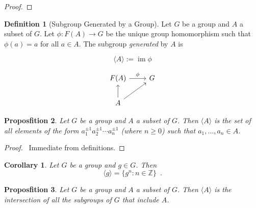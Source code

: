 \documentclass{book}
\let\qed\relax
\newtheorem{prop}{Proposfition}[chapter]
\newtheorem{cor}{Corollary}[prop]
\theoremstyle{definition}
\newtheorem{df}[prop]{Definition}
\newcommand{\im}{\ensuremath{\operatorname{im}}}
\begin{document}
\begin{proof}
    \pf
    \qed
\end{proof}

\begin{df}[Subgroup Generated by a Group]
Let $G$ be a group and $A$ a subset of $G$. Let $\phi : F(A) \rightarrow G$ be the unique group homomorphism such that $\phi(a) = a$ for all $a \in A$. The subgroup \emph{generated} by $A$ is

\[ \langle A \rangle := \im \phi \]

\[ \begin{tikzcd}
F(A) \arrow[r,"\phi"] & G \\
A \arrow[u] \arrow[ur]
\end{tikzcd} \]
\end{df}

\begin{prop}
Let $G$ be a group and $A$ a subset of $G$. Then $\langle A \rangle$ is the set of all elements of the form $a_1^{\pm 1} a_2^{\pm 1} \cdots a_n^{\pm 1}$ (where $n \geq 0$) such that $a_1, \ldots, a_n \in A$.
\end{prop}

\begin{proof}
\pf\ Immediate from definitions. \qed
\end{proof}

\begin{cor}
Let $G$ be a group and $g \in G$. Then
\[ \langle g \rangle = \{ g^n : n \in \mathbb{Z} \} \enspace . \]
\end{cor}

\begin{prop}
Let $G$ be a group and $A$ a subset of $G$. Then $\langle A \rangle$ is the intersection of all the subgroups of $G$ that include $A$.
\end{prop}
\end{document}
